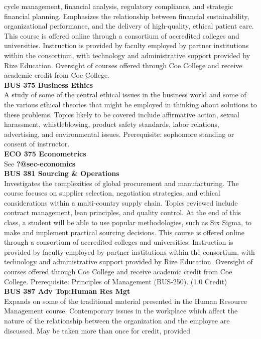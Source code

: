 \documentclass[
  letterpaper,
]{scrbook}
\begin{document}
cycle management, financial analysis, regulatory compliance, and
strategic financial planning. Emphasizes the relationship between
financial sustainability, organizational performance, and the delivery
of high-quality, ethical patient care. This course is offered online
through a consortium of accredited colleges and universities.
Instruction is provided by faculty employed by partner institutions
within the consortium, with technology and administrative support
provided by Rize Education. Oversight of courses offered through Coe
College and receive academic credit from Coe College.\\
\textbf{BUS 375 Business Ethics}\\
A study of some of the central ethical issues in the business world and
some of the various ethical theories that might be employed in thinking
about solutions to these problems. Topics likely to be covered include
affirmative action, sexual harassment, whistleblowing, product safety
standards, labor relations, advertising, and environmental issues.
Prerequisite: sophomore standing or consent of instructor.\\
\textbf{ECO 375 Econometrics}\\
See \textbf{?@sec-economics}\\
\textbf{BUS 381 Sourcing \& Operations}\\
Investigates the complexities of global procurement and manufacturing.
The course focuses on supplier selection, negotiation strategies, and
ethical considerations within a multi-country supply chain. Topics
reviewed include contract management, lean principles, and quality
control. At the end of this class, a student will be able to use popular
methodologies, such as Six Sigma, to make and implement practical
sourcing decisions. This course is offered online through a consortium
of accredited colleges and universities. Instruction is provided by
faculty employed by partner institutions within the consortium, with
technology and administrative support provided by Rize Education.
Oversight of courses offered through Coe College and receive academic
credit from Coe College. Prerequisite: Principles of Management
(BUS-250). (1.0 Credit)\\
\textbf{BUS 387 Adv Top:Human Res Mgt}\\
Expands on some of the traditional material presented in the Human
Resource Management course. Contemporary issues in the workplace which
affect the nature of the relationship between the organization and the
employee are discussed. May be taken more than once for credit, provided
\end{document}
